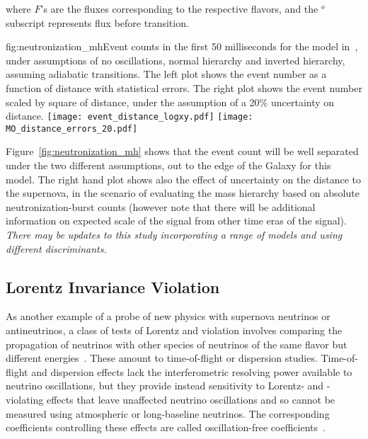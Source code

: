 where $F$'s are the fluxes corresponding to the respective flavors,
and the $^o$ subscript represents flux before transition.

\begin{dunefigure}[MH1]{fig:neutronization_mh}{Event counts in the
    first 50 milliseconds for the model in~\cite{Huedepohl}, under
    assumptions of no oscillations, normal hierarchy and inverted
    hierarchy, assuming adiabatic  transitions.  The left plot
    shows the event number as a function of distance with statistical
    errors.  The right plot
    shows the event number scaled by square of distance, under the
    assumption of a 20\% uncertainty on distance. }
\texttt{[image: event\_distance\_logxy.pdf]}
\texttt{[image: MO\_distance\_errors\_20.pdf]}
\end{dunefigure}

Figure~\ref{fig:neutronization_mh} shows that the event count will be
well separated under the two different assumptions, out to the edge of
the Galaxy for this model.  The right hand plot shows also the effect of uncertainty
on the distance to the supernova, in the scenario of evaluating the
mass hierarchy based on absolute neutronization-burst counts (however
note that there will be additional information on expected scale of
the signal from other time eras of the signal). \textit{There may be
  updates to this study incorporating a range of models and using
  different discriminants.}


\subsection{Lorentz Invariance Violation}

As another example of a probe of new physics with supernova neutrinos or antineutrinos,
a class of tests of Lorentz and  violation involves comparing the propagation of neutrinos with other species of neutrinos of the same flavor but different energies~\cite{Kostelecky:2003cr,Kostelecky:2003xn,Kostelecky:2011gq,Diaz:2009qk}. These amount to time-of-flight or dispersion studies.
Time-of-flight and dispersion effects lack the interferometric resolving power available to neutrino oscillations, but they provide instead sensitivity to Lorentz- and -violating effects that  leave unaffected neutrino oscillations
and so cannot be measured using atmospheric or long-baseline neutrinos.
The corresponding  coefficients controlling these effects are called oscillation-free coefficients~\cite{Kostelecky:2011gq}.

